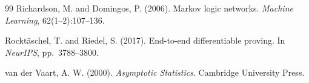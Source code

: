 \documentclass[letterpaper]{article}
\begin{document}
\begin{thebibliography}{99}
Richardson, M. and Domingos, P. (2006).
Markov logic networks.
\textit{Machine Learning}, 62(1--2):107--136.

Rockt{\"a}schel, T. and Riedel, S. (2017).
End-to-end differentiable proving.
In \textit{NeurIPS}, pp.\ 3788--3800.

van der Vaart, A. W. (2000).
\textit{Asymptotic Statistics}.
Cambridge University Press.

\end{thebibliography}

\appendix

\end{document}
